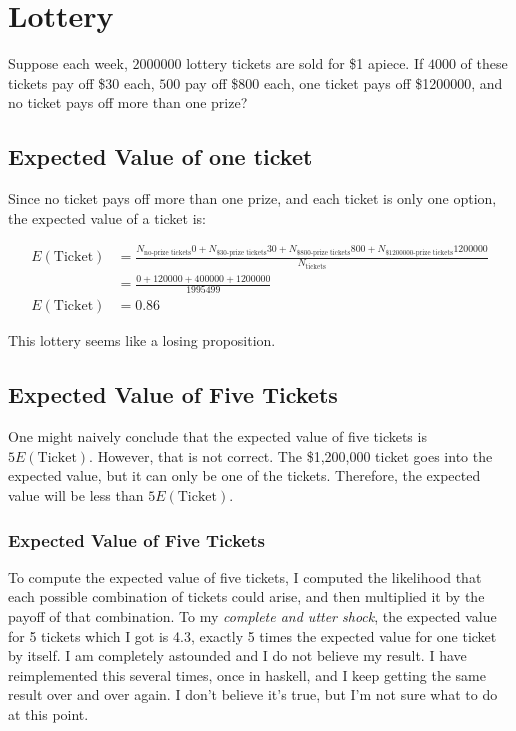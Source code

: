 \documentclass{article}
\begin{document}

\section{Lottery}

Suppose each week, $2000000$ lottery tickets are sold for \$1 apiece.
If $4000$ of these tickets pay off \$30 each,
	$500$ pay off \$800 each, one ticket pays off \$1200000,
	and no ticket pays off more than one prize?

\subsection{Expected Value of one ticket}

Since no ticket pays off more than one prize, and each ticket is only
	one option, the expected value of a ticket is:

\begin{align*}
E\left( \text{Ticket} \right)
	& = \frac{
		N_\text{no-prize tickets} 
			0
		+ N_\text{\$30-prize tickets}
			30
		+ N_\text{\$800-prize tickets} 800
		+ N_\text{\$1200000-prize tickets} 1200000}{N_\text{tickets}} \\
	& = \frac{0 + 120000 + 400000 + 1200000}{1995499}\\
E\left( \text{Ticket} \right)
	& = 0.86
\end{align*}

This lottery seems like a losing proposition.

\subsection{Expected Value of Five Tickets}

One might naively conclude that the expected value of five tickets
	is $5 E\left( \text{Ticket} \right)$.
However, that is not correct.
The \$1,200,000 ticket goes into the expected value, but it can only
	be one of the tickets.
Therefore, the expected value will be less than $5 E\left( \text{Ticket} \right)$.

\subsubsection{Expected Value of Five Tickets}

To compute the expected value of five tickets, I computed the likelihood that each
	possible combination of tickets could arise, and then multiplied it	by
	the payoff of that combination.
To my \emph{complete and utter shock}, the expected value for 5 tickets which I got 
	is 4.3, exactly 5 times the expected value for one ticket by itself.
I am completely astounded and I do not believe my result. 
I have reimplemented this several times, once in haskell, and I keep getting the same
	result over and over again.
I don't believe it's true, but I'm not sure what to do at this point.
\end{document}

